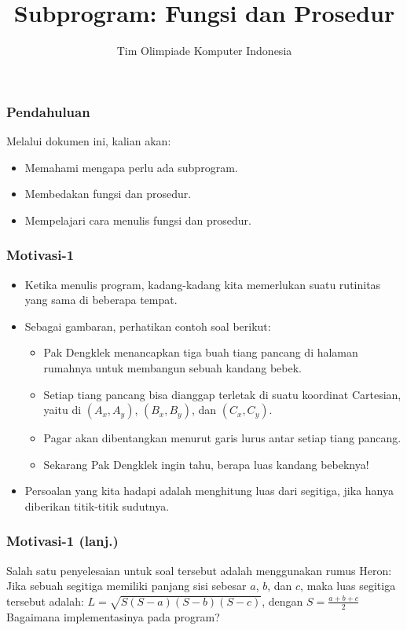 \documentclass{beamer}
\title{Subprogram: Fungsi dan Prosedur}
\author{Tim Olimpiade Komputer Indonesia}
\begin{document}
\begin{frame}
\titlepage
\end{frame}

\begin{frame}
\frametitle{Pendahuluan}
Melalui dokumen ini, kalian akan:
\begin{itemize}
	\item Memahami mengapa perlu ada subprogram.
	\item Membedakan fungsi dan prosedur.
	\item Mempelajari cara menulis fungsi dan prosedur.
\end{itemize}
\end{frame}

\begin{frame}
\frametitle{Motivasi-1}
\begin{itemize}
	\item Ketika menulis program, kadang-kadang kita memerlukan suatu rutinitas yang sama di beberapa tempat.
	\item Sebagai gambaran, perhatikan contoh soal berikut:
	\begin{itemize}
		\item Pak Dengklek menancapkan tiga buah tiang pancang di halaman rumahnya untuk membangun sebuah kandang bebek.
		\item Setiap tiang pancang bisa dianggap terletak di suatu koordinat Cartesian, yaitu di $(A_x, A_y)$, $(B_x, B_y)$, dan $(C_x, C_y)$.
		\item Pagar akan dibentangkan menurut garis lurus antar setiap tiang pancang.
		\item Sekarang Pak Dengklek ingin tahu, berapa luas kandang bebeknya!
	\end{itemize}
	\item Persoalan yang kita hadapi adalah menghitung luas dari segitiga, jika hanya diberikan titik-titik sudutnya.
\end{itemize}
\end{frame}

\begin{frame}
\frametitle{Motivasi-1 (lanj.)}
Salah satu penyelesaian untuk soal tersebut adalah menggunakan rumus Heron:
\newline \newline
Jika sebuah segitiga memiliki panjang sisi sebesar $a$, $b$, dan $c$, maka luas segitiga tersebut adalah:
\newline
$L = \sqrt{S(S-a)(S-b)(S-c)}$, dengan $S = \frac{a+b+c}{2}$
\vfill
Bagaimana implementasinya pada program?
\end{frame}
\end{document}
